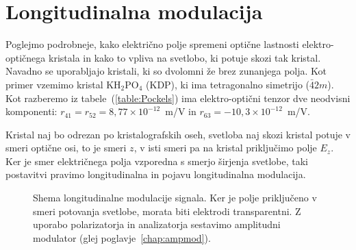 \section{Longitudinalna modulacija}
Poglejmo podrobneje, kako električno polje spremeni optične lastnosti 
elektro-optičnega kristala in kako to vpliva na svetlobo, ki potuje skozi tak kristal.
Navadno se uporabljajo kristali, ki so dvolomni že brez zunanjega polja. 
Kot primer vzemimo kristal KH$_{2}$PO$_{4}$ (KDP), ki ima tetragonalno 
simetrijo ($\bar{4}2m$). Kot razberemo iz tabele~(\ref{table:Pockels}) ima 
elektro-optični tenzor dve neodvisni komponenti: $r_{41} = r_{52}=8,77 \times 10^{-12}$~m/V
in $r_{63}= -10,3 \times 10^{-12}$~m/V.

Kristal naj bo odrezan po kristalografskih oseh, svetloba naj skozi kristal potuje 
v smeri optične osi, to je smeri $z$, v isti smeri pa na kristal priključimo
polje $E_z$. Ker je smer električnega polja vzporedna s smerjo širjenja svetlobe, taki 
postavitvi pravimo longitudinalna in pojavu longitudinalna 
modulacija. 
\begin{figure}[h]
\centering
\def\svgwidth{80truemm} 

\caption{Shema longitudinalne modulacije signala. Ker je polje priključeno v smeri
potovanja svetlobe, morata biti elektrodi transparentni. Z uporabo polarizatorja in 
analizatorja sestavimo amplitudni modulator (glej poglavje~\ref{chap:ampmod}).}
\label{fig:amshema}
\end{figure}

